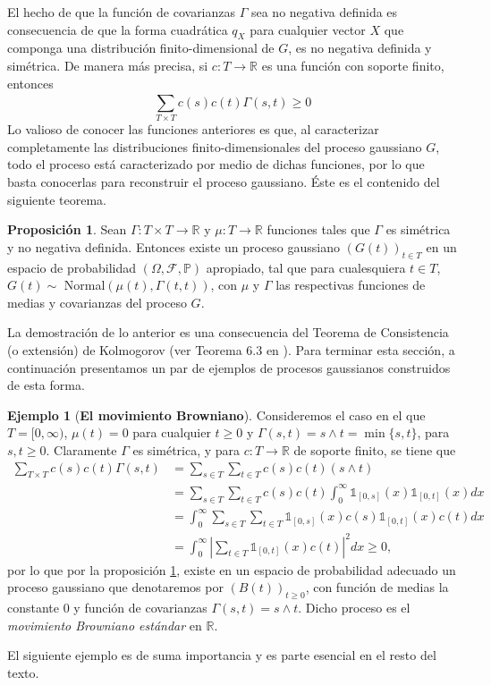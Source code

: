 \documentclass[letterpaper,twoside,12pt]{book}
\newcommand{\R}{\mathbb{R}}
\newcommand{\F}{\mathcal{F}}
\renewcommand{\P}{\mathbb{P}}
\newcommand{\1}{\mathds{1}}
\newcommand{\abs}[1]{\left\lvert #1 \right\rvert}
\renewcommand{\to}{\rightarrow}
\theoremstyle{definition}
\theoremstyle{definition}
\theoremstyle{remark}
\theoremstyle{definition}
\theoremstyle{definition}
\newtheorem{prop}{Proposición}
\theoremstyle{definition}
\theoremstyle{definition}
\newtheorem{ejem}{Ejemplo}
\theoremstyle{definition}
\begin{document}
El hecho de que la función de covarianzas $\Gamma$ sea no negativa definida es consecuencia de que la forma cuadrática $q_X$ para cualquier vector $X$ que componga una distribución finito-dimensional de $G$, es no negativa definida y simétrica. De manera más precisa, si $c:T\to \R$ es una función con soporte finito, entonces 
\[  
    \sum_{T\times T}^{}c(s)c(t)\Gamma(s,t)\geq0
\]
Lo valioso de conocer las funciones anteriores es que, al caracterizar completamente las distribuciones finito-dimensionales del proceso gaussiano $G$, todo el proceso está caracterizado por medio de dichas funciones, por lo que basta conocerlas para reconstruir el proceso gaussiano. Éste es el contenido del siguiente teorema.

\begin{prop}\label{caractprocgauss}
 Sean $\Gamma:T\times T\to \R$ y $\mu:T\to \R$ funciones tales que $\Gamma$ es simétrica y no negativa definida. Entonces existe un proceso gaussiano $(G(t))_{t\in T}$ en un espacio de probabilidad $(\Omega, \F,\P)$ apropiado, tal que para cualesquiera $t\in T$, $G(t)\sim$ Normal$(\mu(t),\Gamma(t,t))$, con $\mu$ y $\Gamma$ las respectivas funciones de medias y covarianzas del proceso $G$.
 \end{prop}
 La demostración de lo anterior es una consecuencia del Teorema de Consistencia (o extensión) de Kolmogorov (ver Teorema 6.3 en \cite{gall2016brownian} ). Para terminar esta sección, a continuación presentamos un par de ejemplos de procesos gaussianos construidos de esta forma.
\begin{ejem}[\textbf{El movimiento Browniano}]
Consideremos el caso en el que $T=[0,\infty)$, $\mu(t)=0$ para cualquier $t\geq0$ y $\Gamma(s,t)=s\wedge t=\min\{s,t\}$, para $s,t\geq0$. Claramente $\Gamma$ es simétrica, y para $c:T\to\R$ de soporte finito, se tiene que
\begin{align*}
\sum_{T\times T}^{}c(s)c(t)\Gamma(s,t)&=\sum_{s\in T}^{}\sum_{t\in T}c(s)c(t)(s\wedge t)\\
&=\sum_{s\in T}^{}\sum_{t\in T}c(s)c(t)\int_{0}^{\infty}\1_{[0,s]}(x)\1_{[0,t]}(x)dx\\
&=\int_{0}^{\infty}\sum_{s\in T}\sum_{t\in T}\1_{[0,s]}(x)c(s)\1_{[0,t]}(x)c(t)dx\\
&=\int_{0}^{\infty}\abs{\sum_{t\in T}\1_{[0,t]}(x)c(t)}^2dx \geq0,
\end{align*}
por lo que por la proposición \ref{caractprocgauss}, existe en un espacio de probabilidad adecuado un proceso gaussiano que denotaremos por $(B(t))_{t\geq0}$, con función de medias la constante 0 y función de covarianzas $\Gamma(s,t)=s\wedge t$. Dicho proceso es el \textit{movimiento Browniano estándar} en $\R$.
 \end{ejem}
El siguiente ejemplo es de suma importancia y es parte esencial en el resto del texto.
\end{document}
